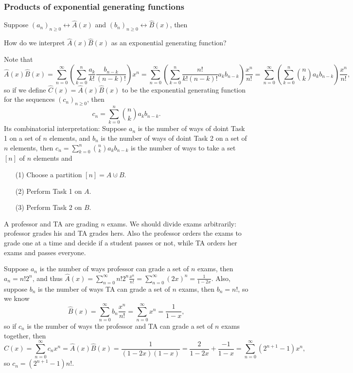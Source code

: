 \subsubsection{Products of exponential generating functions}
Suppose \((a_n)_{n \ge 0} \leftrightarrow \hat{A} (x)\) and \((b_n)_{n \ge 0} \leftrightarrow \hat{B} (x)\), then 
\begin{question}
    How do we interpret \(\hat{A} (x) \hat{B} (x)\) as an exponential generating function? 
\end{question}  

Note that 
\[
    \hat{A} (x) \hat{B} (x) = \sum_{n=0}^{\infty} \left( \sum_{k=0}^n \frac{a_k}{k!} \frac{b_{n-k}}{(n-k)!}  \right) x^n = \sum_{n=0}^{\infty} \left( \sum_{k=0}^n \frac{n!}{k! (n - k)!} a_k b_{n-k}  \right) \frac{x^n}{n!} = \sum_{n=0}^{\infty} \left( \sum_{k=0}^n \binom{n}{k} a_k b_{n-k}  \right) \frac{x^n}{n!} ,  
\]
so if we define \(\hat{C} (x) = \hat{A} (x) \hat{B} (x)\) to be the exponential generating function for the sequences \((c_n)_{n \ge 0}\), then 
\[
    c_n = \sum_{k=0}^n \binom{n}{k} a_k b_{n-k}. 
\]  
Its combinatorial interpretation: Suppose \(a_n\) is the number of ways of doint Task 1 on a set of \(n\) elements, and \(b_n\) is the number of ways of doint Task 2 on a set of \(n\) elements, then \(c_n = \sum_{k=0}^n \binom{n}{k} a_k b_{n-k} \) is the number of ways to take a set \([n]\) of \(n\) elements and 
\begin{itemize}
    \item [(1)] Choose a partition \([n] = A \cupdot B\). 
    \item [(2)] Perform Task 1 on \(A\). 
    \item [(3)] Perform Task 2 on \(B\).  
\end{itemize}       

\begin{eg}
    A professor and TA are grading \(n\) exams. We should divide exams arbitrarily: professor grades his and TA grades hers. Also the professor orders the exams to grade one at a time and decide if a student passes or not, while TA orders her exams and passes everyone.
\end{eg}
\begin{explanation}
    Suppose \(a_n\) is the number of ways professor can grade a set of \(n\) exams, then \(a_n = n! 2^n\), and thus \(\hat{A} (x) = \sum_{n=0}^{\infty} n! 2^n \frac{x^n}{n!} = \sum_{n=0}^{\infty} (2x)^n = \frac{1}{1 - 2x}  \). Also, suppose \(b_n\) is the number of ways TA can grade a set of \(n\) exams, then \(b_n = n!\), so we know 
    \[
        \hat{B} (x) = \sum_{n=0}^{\infty} b_n \frac{x^n}{n!} = \sum_{n=0}^{\infty} x^n = \frac{1}{1 - x}, 
    \] so if \(c_n\) is the number of ways the professor and TA can grade a set of \(n\) exams together, then 
    \[
        \hat{C} (x) = \sum_{n=0}^{\infty} c_n x^n = \hat{A} (x) \hat{B} (x) =   \frac{1}{(1-2x)(1-x)} = \frac{2}{1-2x} + \frac{-1}{1-x} = \sum_{n = 0}^{\infty} \left( 2^{n+1} - 1 \right)x^n,  
    \]  
     so \(c_n = \left( 2^{n+1} - 1 \right) n! \). 
\end{explanation}